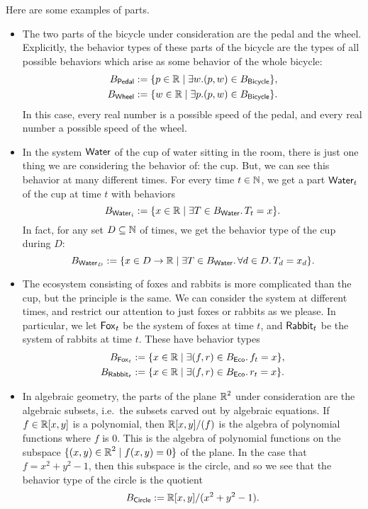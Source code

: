 \begin{ex}
Here are some examples of parts.
\begin{itemize}
    \item The two parts of the bicycle under consideration are the pedal and the wheel. Explicitly, the behavior types of these parts of the bicycle are the types of all possible behaviors which arise as some behavior of the whole bicycle:
    \begin{align*}
        B_{\mathsf{{Pedal}}} &:= \{ p \in \operatorname{\mathbb{R}} \mid \exists w. (p, w) \in B_{\mathsf{{Bicycle}}}\},\\
        B_{\mathsf{{Wheel}}} &:= \{ w \in \operatorname{\mathbb{R}} \mid \exists p. (p, w) \in B_{\mathsf{{Bicycle}}}\}.
    \end{align*}
    In this case, every real number is a possible speed of the pedal, and every real number a possible speed of the wheel.
    
    \item In the system $\mathsf{{Water}}$ of the cup of water sitting in the room, there is just one thing we are considering the behavior of: the cup. But, we can see this behavior at many different times. For every time $t \in \operatorname{\mathbb{N}}$, we get a part $\mathsf{{Water}}_t$ of the cup at time $t$ with behaviors
    $$B_{\mathsf{{Water}}_i} := \{ x \in \operatorname{\mathbb{R}} \mid \exists T \in B_{\mathsf{{Water}}}.\, T_t = x\}.$$
    In fact, for any set $D \subseteq \operatorname{\mathbb{N}}$ of times, we get the behavior type of the cup during $D$:
    $$B_{\mathsf{{Water}}_D} := \{ x \in D \to \operatorname{\mathbb{R}} \mid \exists T \in B_{\mathsf{{Water}}}.\, \forall d \in D.\, T_d = x_d\}.$$
    
    \item The ecosystem consisting of foxes and rabbits is more complicated than the cup, but the principle is the same. We can consider the system at different times, and restrict our attention to just foxes or rabbits as we please. In particular, we let $\mathsf{{Fox}}_t$ be the system of foxes at time $t$, and $\mathsf{{Rabbit}}_t$ be the system of rabbits at time $t$. These have behavior types
    \begin{align*}
        B_{\mathsf{{Fox}}_t} &:= \{ x \in \operatorname{\mathbb{R}} \mid \exists (f, r) \in B_{\mathsf{{Eco}}}.\, f_t = x\},\\
        B_{\mathsf{{Rabbit}}_t} &:= \{ x \in \operatorname{\mathbb{R}} \mid \exists (f, r) \in B_{\mathsf{{Eco}}}.\, r_t = x\}.
    \end{align*}
    
    \item In algebraic geometry, the parts of the plane $\operatorname{\mathbb{R}}^2$ under consideration are the algebraic subsets, i.e.\ the subsets carved out by algebraic equations. If $f \in \operatorname{\mathbb{R}}[x, y]$ is a polynomial, then $\operatorname{\mathbb{R}}[x, y]/(f)$ is the algebra of polynomial functions where $f$ is $0$. This is the algebra of polynomial functions on the subspace $\{(x, y) \in \operatorname{\mathbb{R}}^2 \mid f(x, y) = 0\}$ of the plane. In the case that $f = x^2 + y^2 - 1$, then this subspace is the circle, and so we see that the behavior type of the circle is the quotient
    $$B_{\mathsf{{Circle}}} := \operatorname{\mathbb{R}}[x, y]/(x^2 + y^2 - 1).$$
    
\end{itemize}
\end{ex}

